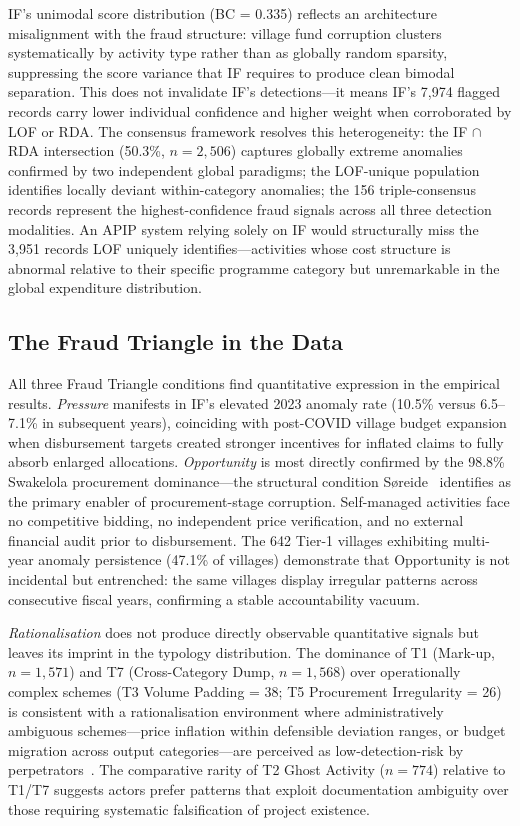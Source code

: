 \documentclass[3p,times,procedia]{elsarticle}
\begin{document}
IF's unimodal score distribution (BC = 0.335) reflects an architecture misalignment with the fraud structure: village fund corruption clusters systematically by activity type rather than as globally random sparsity, suppressing the score variance that IF requires to produce clean bimodal separation. This does not invalidate IF's detections---it means IF's 7,974 flagged records carry lower individual confidence and higher weight when corroborated by LOF or RDA. The consensus framework resolves this heterogeneity: the IF $\cap$ RDA intersection (50.3\%, $n = 2{,}506$) captures globally extreme anomalies confirmed by two independent global paradigms; the LOF-unique population identifies locally deviant within-category anomalies; the 156 triple-consensus records represent the highest-confidence fraud signals across all three detection modalities. An APIP system relying solely on IF would structurally miss the 3,951 records LOF uniquely identifies---activities whose cost structure is abnormal relative to their specific programme category but unremarkable in the global expenditure distribution.

\subsection{The Fraud Triangle in the Data}

All three Fraud Triangle conditions find quantitative expression in the empirical results. \textit{Pressure} manifests in IF's elevated 2023 anomaly rate (10.5\% versus 6.5--7.1\% in subsequent years), coinciding with post-COVID village budget expansion when disbursement targets created stronger incentives for inflated claims to fully absorb enlarged allocations. \textit{Opportunity} is most directly confirmed by the 98.8\% Swakelola procurement dominance---the structural condition S{\o}reide~\cite{ref22} identifies as the primary enabler of procurement-stage corruption. Self-managed activities face no competitive bidding, no independent price verification, and no external financial audit prior to disbursement. The 642 Tier-1 villages exhibiting multi-year anomaly persistence (47.1\% of villages) demonstrate that Opportunity is not incidental but entrenched: the same villages display irregular patterns across consecutive fiscal years, confirming a stable accountability vacuum.

\textit{Rationalisation} does not produce directly observable quantitative signals but leaves its imprint in the typology distribution. The dominance of T1 (Mark-up, $n = 1{,}571$) and T7 (Cross-Category Dump, $n = 1{,}568$) over operationally complex schemes (T3 Volume Padding = 38; T5 Procurement Irregularity = 26) is consistent with a rationalisation environment where administratively ambiguous schemes---price inflation within defensible deviation ranges, or budget migration across output categories---are perceived as low-detection-risk by perpetrators~\cite{ref21}. The comparative rarity of T2 Ghost Activity ($n = 774$) relative to T1/T7 suggests actors prefer patterns that exploit documentation ambiguity over those requiring systematic falsification of project existence.
\end{document}
